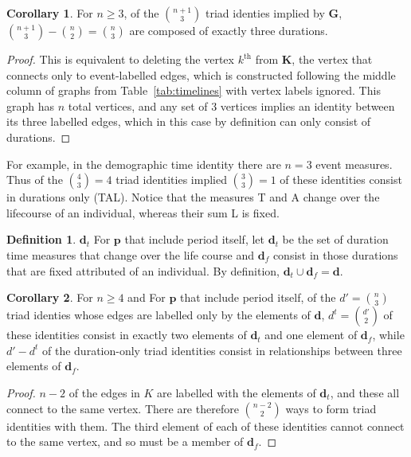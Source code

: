 \documentclass{bmcart}
\theoremstyle{definition}
\newtheorem{definition}{Definition}[section]
\newtheorem{corollary}{Corollary}[proposition]
\begin{document}
\begin{corollary}
For $n \ge 3$, of the $\binom{n+1}{3}$ triad identies implied by $\textbf{G}$,
$\binom{n+1}{3} - \binom{n}{2} = \binom{n}{3}$ are composed of exactly three
durations.
\end{corollary}

\begin{proof}
This is equivalent to deleting the vertex $k^{\text{th}}$ from $\textbf{K}$, the
vertex that connects only to event-labelled edges, which is constructed
following the middle column of graphs from Table~\ref{tab:timelines} with
vertex labels ignored. This graph has $n$ total vertices, and any set of 3
vertices implies an identity between its three labelled edges, which in this
case by definition can only consist of durations.
\end{proof}

For example, in the demographic time identity there are $n=3$ event measures.
Thus of the $\binom{4}{3} = 4$ triad identities implied $\binom{3}{3} = 1$ of
these identities consist in durations only (TAL). Notice that the measures T and
A change over the lifecourse of an individual, whereas their sum L is fixed.

\begin{definition}{$\textbf{d}_t$} For $\textbf{p}$ that include period
itself, let $\textbf{d}_t$ be the set of duration time measures that change over
the life course and $\textbf{d}_f$ consist in those durations that are fixed attributed of an individual. By
definition, $\textbf{d}_t \cup \textbf{d}_f = \textbf{d}$.
\end{definition}

\begin{corollary}
For $n \ge 4$ and For $\textbf{p}$ that include period
itself, of the $d'=\binom{n}{3}$ triad identies whose edges are
labelled only by the elements of $\textbf{d}$, $d^t=\binom{d'}{2}$ of these identities
consist in exactly two elements of $\textbf{d}_t$ and one element of
$\textbf{d}_f$, while $d'-d^t$ of the duration-only triad identities consist in
relationships between three elements of $\textbf{d}_f$.
\end{corollary}

\begin{proof}
$n-2$ of the edges in $K$ are labelled with the elements of $\textbf{d}_t$, and
these all connect to the same vertex. There are therefore $\binom{n-2}{2}$ ways
to form triad identities with them. The third element of each of these
identities cannot connect to the same vertex, and so must be a member of
$\textbf{d}_f$. 
\end{proof}
\end{document}
